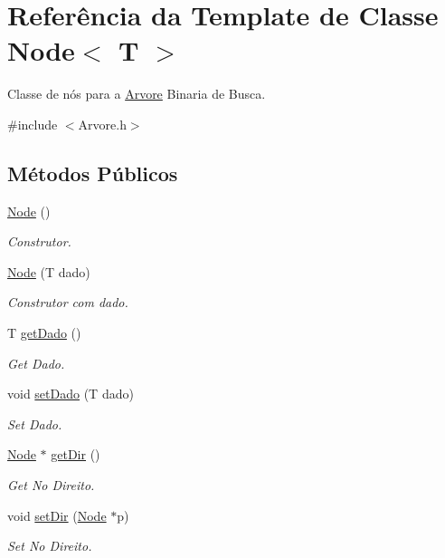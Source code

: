 \hypertarget{classNode}{}\section{Referência da Template de Classe Node$<$ T $>$}
\label{classNode}


Classe de nós para a \hyperlink{classArvore}{Arvore} Binaria de Busca.  




{\ttfamily \#include $<$Arvore.\+h$>$}

\subsection*{Métodos Públicos}
\begin{DoxyCompactItemize}
\item 
\hyperlink{classNode_a0ac1d44cfe588be564acf25485029bd8}{Node} ()
\begin{DoxyCompactList}\small\item\em Construtor. \end{DoxyCompactList}\item 
\hyperlink{classNode_a1ed405745e0be93ff2ef2616405bfdc2}{Node} (T dado)
\begin{DoxyCompactList}\small\item\em Construtor com dado. \end{DoxyCompactList}\item 
T \hyperlink{classNode_abee48d53b678ebe2852ce6262dff8373}{get\+Dado} ()
\begin{DoxyCompactList}\small\item\em Get Dado. \end{DoxyCompactList}\item 
void \hyperlink{classNode_a688af9d8d82a99f49f171146d1c42eee}{set\+Dado} (T dado)
\begin{DoxyCompactList}\small\item\em Set Dado. \end{DoxyCompactList}\item 
\hyperlink{classNode}{Node} $\ast$ \hyperlink{classNode_aedaeaf9b013a27561cec8b27bc0a8f58}{get\+Dir} ()
\begin{DoxyCompactList}\small\item\em Get No Direito. \end{DoxyCompactList}\item 
void \hyperlink{classNode_aee19f2d06c7cdc8b6fa3c0e199f9865a}{set\+Dir} (\hyperlink{classNode}{Node} $\ast$p)
\begin{DoxyCompactList}\small\item\em Set No Direito. \end{DoxyCompactList}\item 

\end{DoxyCompactItemize}
